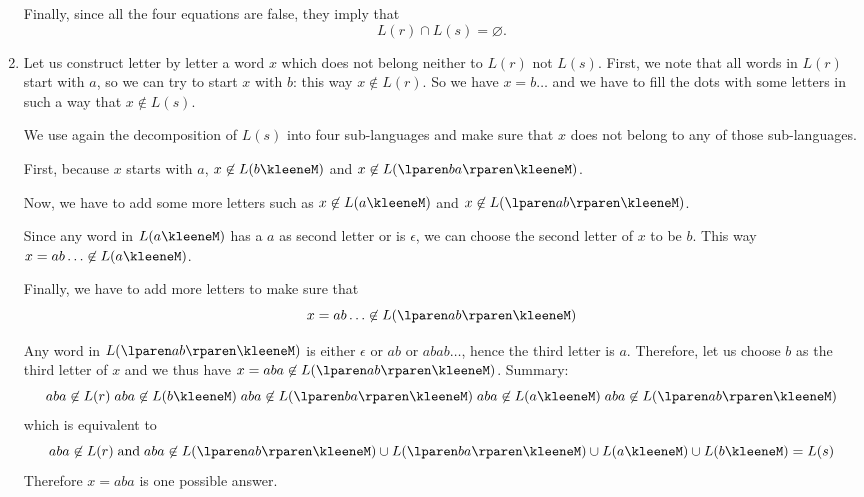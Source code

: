 \begin{enumerate}
\begin{enumerate}
      \end{enumerate}
      Finally, since all the four equations are false, they
        imply that \[L(r) \cap L(s) = \varnothing.\]

    \item Let us construct letter by letter a word \(x\) which
      does not belong neither to \(L(r)\) not \(L(s)\). First, we note
      that all words in \(L(r)\) start with \(a\), so we can try to
      start \(x\) with \(b\): this way \(x \not\in L(r)\). So we have
      \(x = b\ldots\) and we have to fill the dots with some letters
      in such a way that \(x \not\in L(s)\).

      \smallskip

      We use again the decomposition of \(L(s)\) into four
      sub-languages and make sure that \(x\) does not belong to any of
      those sub-languages.

      \smallskip

      First, because \(x\) starts with \(a\), \(x \not\in
      L(b\kleeneM)\) and \(x \not\in L(\lparen ba \rparen\kleeneM)\).

      \smallskip

      Now, we have to add some more letters such as \(x \not\in
      L(a\kleeneM)\) and \(x \not\in L(\lparen ab \rparen\kleeneM)\).

      \smallskip

      Since any word in \(L(a\kleeneM)\) has a \(a\) as second letter
      or is \(\epsilon\), we can choose the second letter of \(x\) to
      be \(b\). This way \(x=ab\ldots \not\in L(a\kleeneM)\).

      \smallskip

      Finally, we have to add more letters to make sure that
      \[x=ab\ldots \not\in L(\lparen ab\rparen\kleeneM)\]

      \smallskip

      Any word in \(L(\lparen ab\rparen\kleeneM)\) is either
      \(\epsilon\) or \(ab\) or \(abab\ldots\), hence the third letter
      is \(a\). Therefore, let us choose \(b\) as the third letter of
      \(x\) and we thus have \(x=aba \not\in L(\lparen
      ab\rparen\kleeneM)\). Summary:
      \[
        aba \not\in L(r) \;
        aba \not\in L(b\kleeneM) \;
        aba \not\in L(\lparen ba\rparen\kleeneM) \;
        aba \not\in L(a\kleeneM) \;
        aba \not\in L(\lparen ab\rparen\kleeneM)
      \]
      \noindent which is equivalent to
      \[
        aba \not\in L(r) \; \text{and} \; aba \not\in L(\lparen ab
        \rparen\kleeneM) \cup L(\lparen ba \rparen\kleeneM) \cup
        L(a\kleeneM) \cup L(b\kleeneM) = L(s)
      \]
      Therefore \(x=aba\) is one possible answer.

\end{enumerate}
